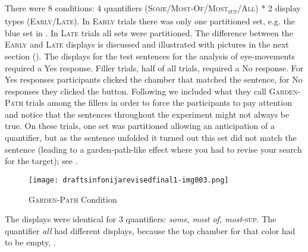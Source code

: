 \documentclass[output=paper]{langscibook}
\begin{document}
There were 8 conditions: 4 quantifiers (\textsc{Some}/\textsc{Most-Of}/\textsc{Most\textsubscript{sup}}\textsc{/All}) * 2 display types
(\textsc{Early}/\textsc{Late}). In \textsc{Early} trials there was only one partitioned set, e.g. the blue set in . In \textsc{Late} trials all sets
were partitioned. The difference between the \textsc{Early} and \textsc{Late} displays is discussed and illustrated with pictures in the
next section (). The displays for the test sentences for the analysis of eye-movements required a Yes response.
Filler trials, half of all trials, required a No response. For Yes responses participants clicked the chamber that
matched the sentence, for No responses they clicked the button. Following \citet{degen2011making,degen2016availability}  we included what they call \textsc{Garden-Path} trials among the fillers in order to force the participants to pay attention and notice
that the sentences throughout the experiment might not always be true. On these trials, one set was partitioned
allowing an anticipation of a quantifier, but as the sentence unfolded it turned out this set did not match the
sentence (leading to a garden-path-like effect where you had to revise your search for
the target); see .

\begin{figure}[h]
\texttt{[image: draftsinfonijarevisedfinal1-img003.png]}
\centering
    \caption{\textsc{Garden-Path} Condition}
    \label{tom:fig:garden}
\end{figure}

The displays were identical for 3 quantifiers: \textit{some}, \textit{most of, most}\textsc{-sup}. The quantifier
\textit{all} had different displays, because the top chamber for that color had to be empty, .




\end{document}
